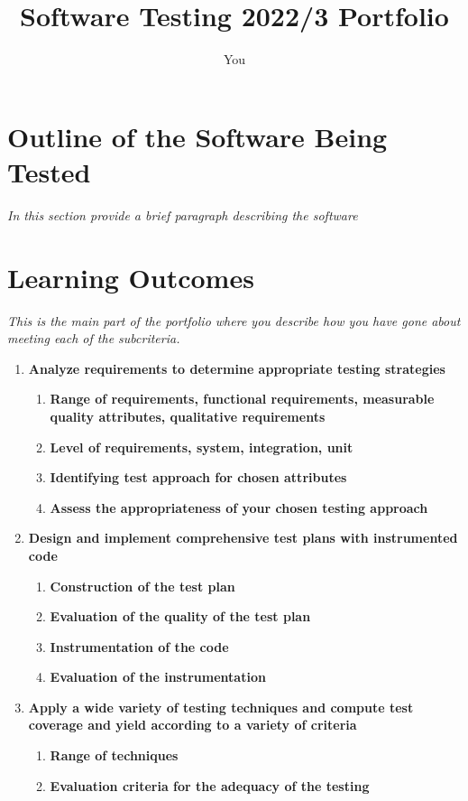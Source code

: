 \documentclass{article}
\title{Software Testing 2022/3 Portfolio}
\author{You}
\begin{document}
\maketitle

\section{Outline of the Software Being Tested}
\textit{In this section provide a brief paragraph describing the software}

\section{Learning Outcomes}
\textit{This is the main part of the portfolio where you describe how you have gone about meeting each of the subcriteria.}
\begin{enumerate}
\item \textbf{Analyze requirements to determine appropriate testing strategies} \marginpar{[default 20\%]}
\begin{enumerate}
\item \textbf{Range of requirements, functional requirements, measurable quality attributes, qualitative requirements}
\item \textbf{Level of requirements, system, integration, unit}
\item \textbf{Identifying test approach for chosen attributes}
\item \textbf{Assess the appropriateness of your chosen testing approach}
\end{enumerate}
\item \textbf{Design and implement comprehensive test plans with instrumented code} \marginpar{[default 20\%]}
\begin{enumerate}
\item \textbf{Construction of the test plan}
\item \textbf{Evaluation of the quality of the test plan}
\item \textbf{Instrumentation of the code}
\item \textbf{Evaluation of the instrumentation}
\end{enumerate}
\item \textbf{Apply a wide variety of testing techniques and compute test coverage and yield according to a variety of criteria} \marginpar{[default 20\%]}
\begin{enumerate}
\item\textbf{Range of techniques}
\item\textbf{Evaluation criteria for the adequacy of the testing}

\end{enumerate}
\end{enumerate}
\end{document}
